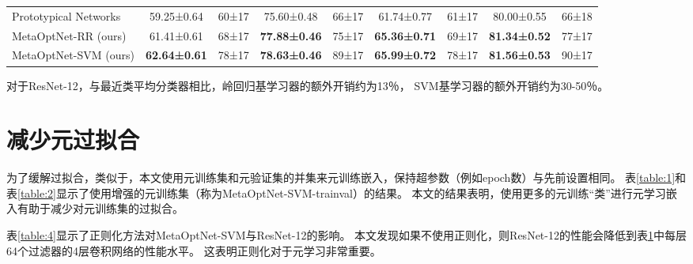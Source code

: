 \begin{table}[htbp]
{\begin{tabular}{lcccccccc}
    Prototypical Networks & 59.25±0.64          & 60±17              & 75.60±0.48          & 66±17             & 61.74±0.77          & 61±17             & 80.00±0.55          & 66±18             \\
    MetaOptNet-RR (ours)  & 61.41±0.61          & 68±17              & \textbf{77.88±0.46} & 75±17             & \textbf{65.36±0.71} & 69±17             & \textbf{81.34±0.52} & 77±17             \\
    MetaOptNet-SVM (ours) & \textbf{62.64±0.61} & 78±17              & \textbf{78.63±0.46} & 89±17             & \textbf{65.99±0.72} & 78±17             & \textbf{81.56±0.53} & 90±17             \\ \hline
    \end{tabular}
    }
    \label{table:3}
    \end{table}

对于ResNet-12，与最近类平均分类器相比，岭回归基学习器的额外开销约为13％，
SVM基学习器的额外开销约为30-50％。

\section{减少元过拟合}

为了缓解过拟合，类似于，本文使用元训练集和元验证集的并集来元训练嵌入，保持超参数（例如epoch数）与先前设置相同。
表\ref{table:1}和表\ref{table:2}显示了使用增强的元训练集（称为MetaOptNet-SVM-trainval）的结果。
本文的结果表明，使用更多的元训练“类”进行元学习嵌入有助于减少对元训练集的过拟合。

表\ref{table:4}显示了正则化方法对MetaOptNet-SVM与ResNet-12的影响。
本文发现如果不使用正则化，则ResNet-12的性能会降低到表\ref{table:3}中每层64个过滤器的4层卷积网络的性能水平。
这表明正则化对于元学习非常重要。

